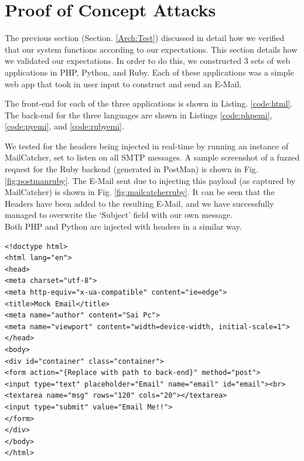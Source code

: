 \section{Proof of Concept Attacks}
The previous section (Section. \ref{Arch:Test}) discussed in detail how we verified that our system functions according to our expectations. This section details how we validated our expectations. In order to do this, we constructed 3 sets of web applications in PHP, Python, and Ruby. Each of these applications was a simple web app that took in user input to construct and send an E-Mail.

The front-end for each of the three applications is shown in Listing. \ref{code:html}. The back-end for the three languages are shown in Listings \ref{code:phpemi}, \ref{code:pyemi}, and \ref{code:rubyemi}.

We tested for the headers being injected in real-time by running an instance of MailCatcher, set to listen on all SMTP messages. A sample screenshot of a fuzzed request for the Ruby backend (generated in PostMan) is shown in Fig. \ref{fig:postmanruby}. The E-Mail sent due to injecting this payload (as captured by MailCatcher) is shown in Fig. \ref{fig:mailcatcherruby}. It can be seen that the Headers have been added to the resulting E-Mail, and we have successfully managed to overwrite the `Subject' field with our own message.\\
Both PHP and Python are injected with headers in a similar way.

\begin{lstlisting}
<!doctype html>
<html lang="en">
<head>
<meta charset="utf-8">
<meta http-equiv="x-ua-compatible" content="ie=edge">
<title>Mock Email</title>
<meta name="author" content="Sai Pc">
<meta name="viewport" content="width=device-width, initial-scale=1">
</head>
<body>
<div id="container" class="container">
<form action="{Replace with path to back-end}" method="post">
<input type="text" placeholder="Email" name="email" id="email"><br>
<textarea name="msg" rows="120" cols="20"></textarea>
<input type="submit" value="Email Me!!">
</form>
</div>
</body>
</html>

\end{lstlisting}

